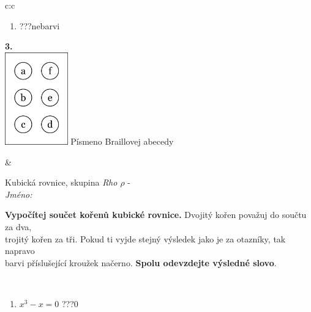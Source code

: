 \documentclass[10pt]{report}
\begin{document}
\begin{tabular}{c:c}
\begin{minipage}[c][104.5mm][t]{0.5\linewidth}
\begin{center}
\begin{minipage}{0.79\linewidth}
\begin{center}
\begin{varwidth}{\linewidth}
\begin{enumerate}
\item \quad \dotfill\; ???\;\dotfill \quad nebarvi
\end{enumerate}
\end{varwidth}
\end{center}
\end{minipage}
\begin{minipage}{0.20\linewidth}
\begin{center}
{\Huge\bfseries 3.} \\[2mm]
\includegraphics[height=40mm]{../images/braille.png}
{\small Písmeno Braillovej abecedy}
\end{center}
\end{minipage}
\end{center}
\end{minipage}
&
\begin{minipage}[c][104.5mm][t]{0.5\linewidth}
\begin{center}
\vspace{7mm}
{\huge Kubická rovnice, skupina \textit{Rho $\rho$} -}\\[5mm]
\textit{Jméno:}\phantom{xxxxxxxxxxxxxxxxxxxxxxxxxxxxxxxxxxxxxxxxxxxxxxxxxxxxxxxxxxxxxxxxx}\\[5mm]
\begin{minipage}{0.95\linewidth}
\begin{center}
\textbf{Vypočítej součet kořenů kubické rovnice.} Dvojitý kořen považuj do součtu za dva,\\trojitý kořen za tři. Pokud ti vyjde stejný výsledek jako je za otazníky, tak napravo\\barvi příslušející kroužek načerno. \textbf{Spolu odevzdejte výsledné slovo}.
\end{center}
\end{minipage}
\\[1mm]
\begin{minipage}{0.79\linewidth}
\begin{center}
\begin{varwidth}{\linewidth}
\begin{enumerate}
\Large
\item $x^3-x=0$\quad \dotfill\; ???\;\dotfill \quad $0$

\end{enumerate}
\end{varwidth}
\end{center}
\end{minipage}
\end{center}
\end{minipage}
\end{tabular}
\end{document}
